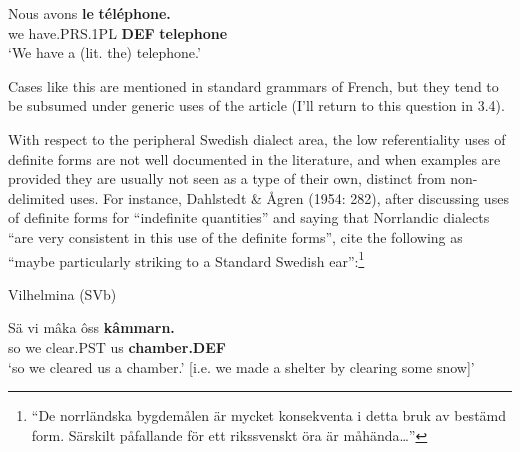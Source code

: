 
 \ea\label{}
\gll Nous  avons  \textbf{le} \textbf{téléphone.}\\


we  have.PRS.1PL  \textbf{DEF} \textbf{telephone}\\

\glt ‘We have a (lit. the) telephone.’

\z

Cases like this are mentioned in standard grammars of French, but they tend to be subsumed under generic uses of the article (I’ll return to this question in 3.4). 


With respect to the peripheral Swedish dialect area, the low referentiality uses of definite forms are not well documented in the literature, and when examples are provided they are usually not seen as a type of their own, distinct from non-delimited uses. For instance, Dahlstedt \& Ågren (1954: 282), after discussing uses of definite forms for “indefinite quantities” and saying that Norrlandic dialects “are very consistent in this use of the definite forms”, cite the following as “maybe particularly striking to a Standard Swedish ear”:\footnote{ “De norrländska bygdemålen är mycket konsekventa i detta bruk av bestämd form. Särskilt påfallande för ett rikssvenskt öra är måhända…”} 


\item 

Vilhelmina (SVb)



 \ea\label{}
\gll Sä  vi  mâka  ôss  \textbf{kâmmarn.}\\


so  we  clear.PST  us  \textbf{chamber.DEF}\\

\glt ‘so we cleared us a chamber.’ [i.e. we made a shelter by clearing some snow]’

